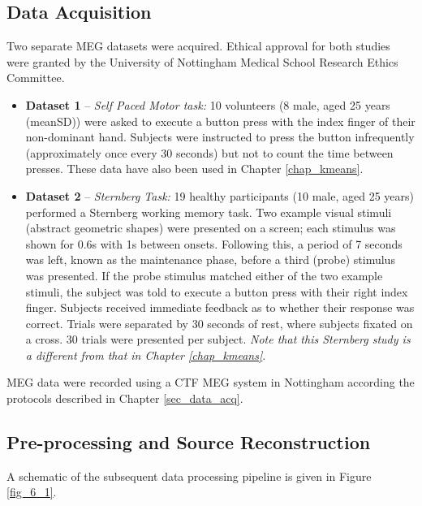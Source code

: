 \subsection{Data Acquisition}
Two separate MEG datasets were acquired. Ethical approval for both studies were granted by the University of Nottingham Medical School Research Ethics Committee.
\begin{itemize}
\item \textbf{Dataset 1} -- \textit{Self Paced Motor task:} 10 volunteers (8 male, aged 25 years (mean\pm SD)) were asked to execute a button press with the index finger of their non-dominant hand. Subjects were instructed to press the button infrequently (approximately once every 30 seconds) but not to count the time between presses. These data have also been used in Chapter \ref{chap_kmeans}. 
\item \textbf{Dataset 2} -- \textit{Sternberg Task:} 19 healthy participants (10 male, aged 25 years) performed a Sternberg working memory task. Two example visual stimuli (abstract geometric shapes) were presented on a screen; each stimulus was shown for 0.6s with 1s between onsets. Following this, a period of 7 seconds was left, known as the maintenance phase, before a third (probe) stimulus was presented. If the probe stimulus matched either of the two example stimuli, the subject was told to execute a button press with their right index finger. Subjects received immediate feedback as to whether their response was correct. Trials were separated by 30 seconds of rest, where subjects fixated on a cross. 30 trials were presented per subject. \textit{Note that this Sternberg study is a different from that in Chapter \ref{chap_kmeans}}.
\end{itemize}

MEG data were recorded using a CTF MEG system in Nottingham according the protocols described in Chapter \ref{sec_data_acq}.

\subsection{Pre-processing and Source Reconstruction}
A schematic of the subsequent data processing pipeline is given in Figure \ref{fig_6_1}. 

